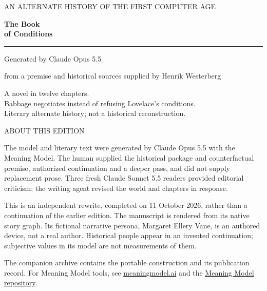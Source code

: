 \documentclass[10pt,twoside]{article}
\begin{document}
\thispagestyle{empty}
\vspace*{0.13\textheight}
\begin{center}
  {\color{brass}\sffamily\small AN ALTERNATE HISTORY OF THE FIRST COMPUTER AGE\par}
  \vspace{1.35em}
  {\fontsize{31pt}{34pt}\selectfont\bfseries The Book\\[0.1em]of Conditions\par}
  \vspace{1.12em}
  {\color{brass}\rule{0.19\textwidth}{0.7pt}\par}
  \vspace{1.35em}
  {\large Generated by Claude Opus 5.5\par}
  \vspace{0.35em}
  {\small from a premise and historical sources supplied by Henrik Westerberg\par}
\end{center}
\vfill
\begin{center}
  \begin{minipage}{0.78\textwidth}
    \centering\footnotesize\sffamily
    A novel in twelve chapters.\\
    Babbage negotiates instead of refusing Lovelace's conditions.\\[0.35em]
    Literary alternate history; not a historical reconstruction.
  \end{minipage}
\end{center}
\vspace*{0.08\textheight}

\clearpage
\thispagestyle{empty}
\begin{center}
  {\color{brass}\sffamily\small ABOUT THIS EDITION\par}
\end{center}
\vspace{1em}
\noindent The model and literary text were generated by Claude Opus 5.5 with the
Meaning Model. The human supplied the historical package and counterfactual
premise, authorized continuation and a deeper pass, and did not supply replacement
prose. Three fresh Claude Sonnet 5.5 readers provided editorial criticism;
the writing agent revised the world and chapters in response.\par
\medskip
\noindent This is an independent rewrite, completed on 11 October 2026, rather
than a continuation of the earlier edition. The manuscript is rendered from its
native story graph. Its fictional narrative persona, Margaret Ellery Vane, is
an authored device, not a real author. Historical people appear in an invented
continuation; subjective values in its model are not measurements of them.\par
\medskip
\noindent The companion archive contains the portable construction and its publication
record. For Meaning Model tools, see \href{https://meaningmodel.ai/}{meaningmodel.ai}
and the \href{https://github.com/emergent-wisdom/meaning-model}{Meaning Model repository}.\par
\clearpage
{}
\setcounter{page}{1}
\fontsize{9.5pt}{11.55pt}\selectfont

\end{document}
